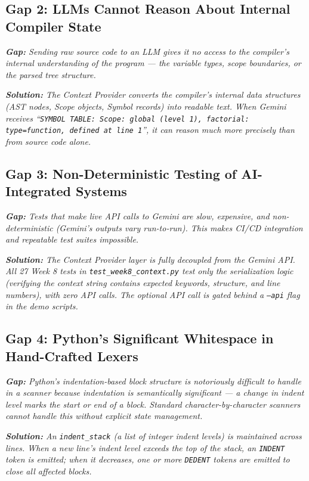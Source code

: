 \documentclass[a4paper,11pt]{article}
\newcommand{\gap}[1]{\textit{\textbf{Gap:} #1}}
\newcommand{\solution}[1]{\textit{\textbf{Solution:} #1}}
\begin{document}
\subsection{Gap 2: LLMs Cannot Reason About Internal Compiler State}

\gap{Sending raw source code to an LLM gives it no access to the compiler's internal understanding of the program --- the variable types, scope boundaries, or the parsed tree structure.}

\solution{The Context Provider converts the compiler's \textit{internal data structures} (AST nodes, Scope objects, Symbol records) into readable text. When Gemini receives ``\texttt{SYMBOL TABLE: Scope: global (level 1), factorial: type=function, defined at line 1}'', it can reason much more precisely than from source code alone.}

\subsection{Gap 3: Non-Deterministic Testing of AI-Integrated Systems}

\gap{Tests that make live API calls to Gemini are slow, expensive, and non-deterministic (Gemini's outputs vary run-to-run). This makes CI/CD integration and repeatable test suites impossible.}

\solution{The Context Provider layer is fully decoupled from the Gemini API. All 27 Week 8 tests in \texttt{test\_week8\_context.py} test only the serialization logic (verifying the context string contains expected keywords, structure, and line numbers), with zero API calls. The optional API call is gated behind a \texttt{--api} flag in the demo scripts.}

\subsection{Gap 4: Python's Significant Whitespace in Hand-Crafted Lexers}

\gap{Python's indentation-based block structure is notoriously difficult to handle in a scanner because indentation is semantically significant --- a change in indent level marks the start or end of a block. Standard character-by-character scanners cannot handle this without explicit state management.}

\solution{An \texttt{indent\_stack} (a list of integer indent levels) is maintained across lines. When a new line's indent level exceeds the top of the stack, an \texttt{INDENT} token is emitted; when it decreases, one or more \texttt{DEDENT} tokens are emitted to close all affected blocks.}
\end{document}
